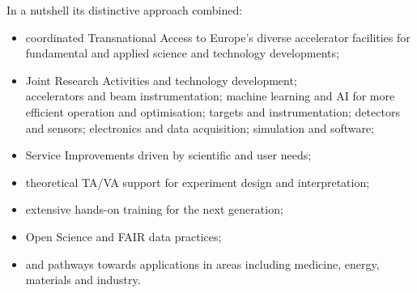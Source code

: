 In a nutshell its distinctive approach combined:
\begin{itemize}
\item coordinated Transnational Access to Europe's diverse accelerator facilities for fundamental and applied science and technology developments; 
\item Joint Research Activities and technology development;\\ accelerators and beam instrumentation; machine learning and AI for more efficient operation and optimisation; targets and instrumentation; detectors and sensors; electronics and data acquisition; simulation and software; 
\item Service Improvements driven by scientific and user needs; 
\item theoretical TA/VA support for experiment design and interpretation; 
\item extensive hands-on training for the next generation; 
\item Open Science and FAIR data practices;
\item and pathways towards applications in areas including medicine, energy, materials and industry. 
\end{itemize}

